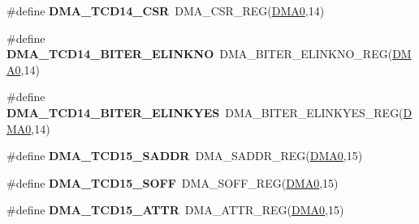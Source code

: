 \begin{DoxyCompactItemize}
\item 
\#define {\bfseries D\+M\+A\+\_\+\+T\+C\+D14\+\_\+\+C\+SR}~D\+M\+A\+\_\+\+C\+S\+R\+\_\+\+R\+EG(\hyperlink{group__DMA__Peripheral__Access__Layer_ga4103044f9ca209772f513dc694513ffb}{D\+M\+A0},14)\hypertarget{group__DMA__Register__Accessor__Macros_gac1607d5f48957b2d42b1c77f4ffe1ed9}{}\label{group__DMA__Register__Accessor__Macros_gac1607d5f48957b2d42b1c77f4ffe1ed9}

\item 
\#define {\bfseries D\+M\+A\+\_\+\+T\+C\+D14\+\_\+\+B\+I\+T\+E\+R\+\_\+\+E\+L\+I\+N\+K\+NO}~D\+M\+A\+\_\+\+B\+I\+T\+E\+R\+\_\+\+E\+L\+I\+N\+K\+N\+O\+\_\+\+R\+EG(\hyperlink{group__DMA__Peripheral__Access__Layer_ga4103044f9ca209772f513dc694513ffb}{D\+M\+A0},14)\hypertarget{group__DMA__Register__Accessor__Macros_ga9798a8bd49bf56c6247968ec1847ba56}{}\label{group__DMA__Register__Accessor__Macros_ga9798a8bd49bf56c6247968ec1847ba56}

\item 
\#define {\bfseries D\+M\+A\+\_\+\+T\+C\+D14\+\_\+\+B\+I\+T\+E\+R\+\_\+\+E\+L\+I\+N\+K\+Y\+ES}~D\+M\+A\+\_\+\+B\+I\+T\+E\+R\+\_\+\+E\+L\+I\+N\+K\+Y\+E\+S\+\_\+\+R\+EG(\hyperlink{group__DMA__Peripheral__Access__Layer_ga4103044f9ca209772f513dc694513ffb}{D\+M\+A0},14)\hypertarget{group__DMA__Register__Accessor__Macros_ga37d94f14acca967633fbc56dac680274}{}\label{group__DMA__Register__Accessor__Macros_ga37d94f14acca967633fbc56dac680274}

\item 
\#define {\bfseries D\+M\+A\+\_\+\+T\+C\+D15\+\_\+\+S\+A\+D\+DR}~D\+M\+A\+\_\+\+S\+A\+D\+D\+R\+\_\+\+R\+EG(\hyperlink{group__DMA__Peripheral__Access__Layer_ga4103044f9ca209772f513dc694513ffb}{D\+M\+A0},15)\hypertarget{group__DMA__Register__Accessor__Macros_ga6eb79f13370be67b54b5ed1fe461adc6}{}\label{group__DMA__Register__Accessor__Macros_ga6eb79f13370be67b54b5ed1fe461adc6}

\item 
\#define {\bfseries D\+M\+A\+\_\+\+T\+C\+D15\+\_\+\+S\+O\+FF}~D\+M\+A\+\_\+\+S\+O\+F\+F\+\_\+\+R\+EG(\hyperlink{group__DMA__Peripheral__Access__Layer_ga4103044f9ca209772f513dc694513ffb}{D\+M\+A0},15)\hypertarget{group__DMA__Register__Accessor__Macros_gaa9109e0dee0d1aa8b467ef00c70f2971}{}\label{group__DMA__Register__Accessor__Macros_gaa9109e0dee0d1aa8b467ef00c70f2971}

\item 
\#define {\bfseries D\+M\+A\+\_\+\+T\+C\+D15\+\_\+\+A\+T\+TR}~D\+M\+A\+\_\+\+A\+T\+T\+R\+\_\+\+R\+EG(\hyperlink{group__DMA__Peripheral__Access__Layer_ga4103044f9ca209772f513dc694513ffb}{D\+M\+A0},15)\hypertarget{group__DMA__Register__Accessor__Macros_ga51d5b5ee407c0a940461edc68f69bea3}{}\label{group__DMA__Register__Accessor__Macros_ga51d5b5ee407c0a940461edc68f69bea3}


\end{DoxyCompactItemize}
